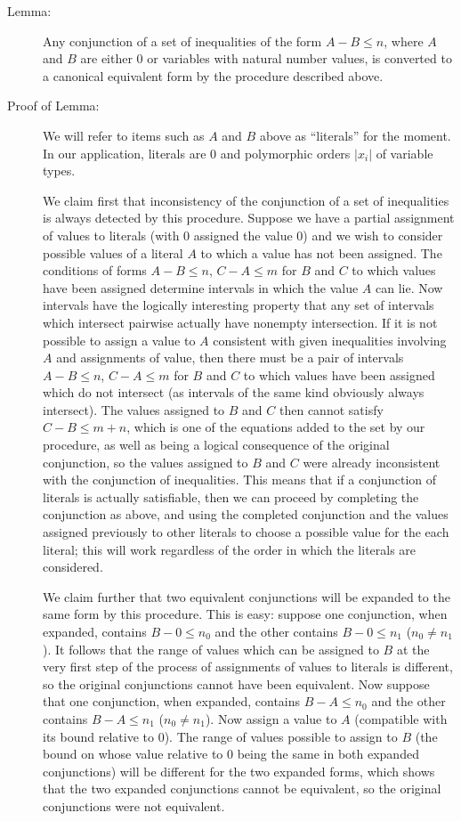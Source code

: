 \documentclass{article}
\begin{document}
\begin{description}

\item[Lemma:] Any conjunction of a set of inequalities of the form
$A-B \leq n$, where $A$ and $B$ are either 0 or variables with natural
number values, is converted to a canonical equivalent form by the
procedure described above.

\item[Proof of Lemma:] We will refer to items such as $A$ and $B$
above as ``literals'' for the moment.  In our application, literals
are 0 and polymorphic orders $|x_i|$ of variable types.

We claim first that inconsistency of the conjunction of a set of
inequalities is always detected by this procedure.  Suppose we have a
partial assignment of values to literals (with 0 assigned the value 0)
and we wish to consider possible values of a literal $A$ to which a
value has not been assigned.  The conditions of forms $A-B \leq n$, $C
- A \leq m$ for $B$ and $C$ to which values have been assigned
determine intervals in which the value $A$ can lie.  Now intervals
have the logically interesting property that any set of intervals
which intersect pairwise actually have nonempty intersection.  If it
is not possible to assign a value to $A$ consistent with given
inequalities involving $A$ and assignments of value, then there must
be a pair of intervals $A-B \leq n$, $C - A \leq m$ for $B$ and $C$ to
which values have been assigned which do not intersect (as intervals
of the same kind obviously always intersect).  The values assigned to
$B$ and $C$ then cannot satisfy $C - B \leq m+n$, which is one of the
equations added to the set by our procedure, as well as being a
logical consequence of the original conjunction, so the values
assigned to $B$ and $C$ were already inconsistent with the conjunction
of inequalities.  This means that if a conjunction of literals is
actually satisfiable, then we can proceed by completing the
conjunction as above, and using the completed conjunction and the
values assigned previously to other literals to choose a possible
value for the each literal; this will work regardless of the order in
which the literals are considered.

We claim further that two equivalent conjunctions will be expanded to
the same form by this procedure.  This is easy: suppose one
conjunction, when expanded, contains $B-0 \leq n_0$ and the other
contains $B-0 \leq n_1$ ($n_0 \neq n_1$).  It follows that the range
of values which can be assigned to $B$ at the very first step of the
process of assignments of values to literals is different, so the
original conjunctions cannot have been equivalent.  Now suppose that
one conjunction, when expanded, contains $B-A \leq n_0$ and the other
contains $B-A \leq n_1$ ($n_0 \neq n_1$).  Now assign a value to $A$
(compatible with its bound relative to 0).  The range of values
possible to assign to $B$ (the bound on whose value relative to 0
being the same in both expanded conjunctions) will be different for
the two expanded forms, which shows that the two expanded conjunctions
cannot be equivalent, so the original conjunctions were not
equivalent.

\end{description}
\end{document}
